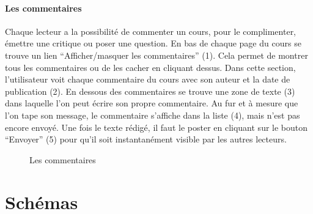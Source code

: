 \documentclass[letterpaper,10pt,oneside]{sphinxmanual}
\begin{document}
\subsubsection{Les commentaires}
\label{functionalities:les-commentaires}
Chaque lecteur a la possibilité de commenter un cours, pour le complimenter, émettre une critique ou poser une question. En bas de chaque page du cours se trouve un lien ``Afficher/masquer les commentaires'' (1). Cela permet de montrer tous les commentaires ou de les cacher en cliquant dessus. Dans cette section, l'utilisateur voit chaque commentaire du cours avec son auteur et la date de publication (2). En dessous des commentaires se trouve une zone de texte (3) dans laquelle l'on peut écrire son propre commentaire. Au fur et à mesure que l'on tape son message, le commentaire s'affiche dans la liste (4), mais n'est pas encore envoyé. Une fois le texte rédigé, il faut le poster en cliquant sur le bouton ``Envoyer'' (5) pour qu'il soit instantanément visible par les autres lecteurs.
\begin{figure}[htbp]
\centering
\capstart

\caption{Les commentaires}\end{figure}


\chapter{Schémas}
\label{schemas:schemas}\label{schemas::doc}
\end{document}
